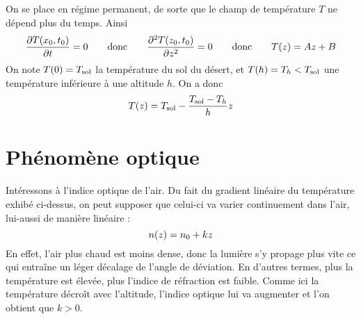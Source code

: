 \documentclass[a4paper,french,bookmarks]{article}
\begin{document}
    On se place en régime permanent, de sorte que le champ de température $T$ ne dépend plus du temps. Ainsi 
    \[ \dfrac{\partial T\!\left(x_0, t_0\right)}{\partial t} = 0 \qquad\text{donc}\qquad \dfrac{\partial^2 T\!\left(z_0, t_0\right)}{\partial z^2} = 0 \qquad\text{donc}\qquad T\!\left(z\right) = Az + B\]
    On note $T\!\left(0\right) = T_\text{sol}$ la température du sol du désert, et $T\!\left(h\right) = T_h < T_\text{sol}$ une température inférieure à une altitude $h$. On a donc
    \[ T\!\left(z\right) = T_\text{sol} - \dfrac{T_\text{sol} - T_h}{h}z\]

    \section{Phénomène optique}

    Intéressons à l'indice optique de l'air. Du fait du gradient linéaire du température exhibé ci-dessus, on peut supposer que celui-ci va varier continuement dans l'air, lui-aussi de manière linéaire :
    \[ n\!\left(z\right) = n_0 + kz\]
    En effet, l'air plus chaud est moins dense, donc la lumière s'y propage plus vite ce qui entraîne un léger décalage de l'angle de déviation. En d'autres termes, plus la température est élevée, plus l'indice de réfraction est faible. Comme ici la température décroît avec l'altitude, l'indice optique lui va augmenter et l'on obtient que $k > 0$.
\end{document}
